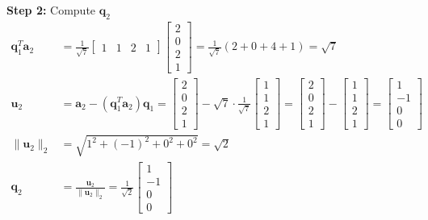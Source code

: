 \textbf{Step 2:} Compute $\mathbf{q}_2$
\begin{align*}
    \mathbf{q}_1^T \mathbf{a}_2 & = \frac{1}{\sqrt{7}}
    \begin{bmatrix}
        1 & 1 & 2 & 1
    \end{bmatrix}
    \begin{bmatrix}
        2 \\ 0 \\ 2 \\ 1
    \end{bmatrix} = \frac{1}{\sqrt{7}}(2 + 0 + 4 + 1) = \sqrt{7}                                                                                                                                                                                                                                                                                                                     \\
    \mathbf{u}_2                & = \mathbf{a}_2 - (\mathbf{q}_1^T \mathbf{a}_2)\mathbf{q}_1 = \begin{bmatrix} 2 \\ 0 \\ 2 \\ 1 \end{bmatrix} - \sqrt{7} \cdot \frac{1}{\sqrt{7}} \begin{bmatrix} 1 \\ 1 \\ 2 \\ 1 \end{bmatrix} = \begin{bmatrix} 2 \\ 0 \\ 2 \\ 1 \end{bmatrix} - \begin{bmatrix} 1 \\ 1 \\ 2 \\ 1 \end{bmatrix} = \begin{bmatrix} 1 \\ -1 \\ 0 \\ 0 \end{bmatrix} \\
    \|\mathbf{u}_2\|_2          & = \sqrt{1^2 + (-1)^2 + 0^2 + 0^2}  = \sqrt{2}                                                                                                                                                                                                                                                                                                      \\
    \mathbf{q}_2                & = \frac{\mathbf{u}_2}{\|\mathbf{u}_2\|_2} = \frac{1}{\sqrt{2}}\begin{bmatrix} 1 \\ -1 \\ 0 \\ 0 \end{bmatrix}
\end{align*}

